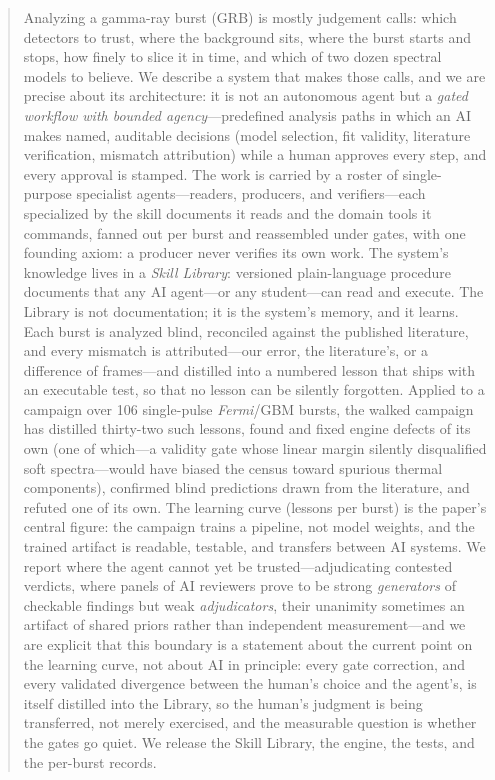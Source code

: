 \begin{abstract}
Analyzing a gamma-ray burst (GRB) is mostly judgement calls: which detectors to trust,
where the background sits, where the burst starts and stops, how finely to
slice it in time, and which of two dozen spectral models to believe.
We describe a system that makes those calls, and we are precise about its
architecture: it is not an autonomous agent but a \emph{gated workflow with
bounded agency}---predefined analysis paths in which an AI makes named,
auditable decisions (model selection, fit validity, literature verification,
mismatch attribution) while a human approves every step, and every approval
is stamped. The work is carried by a roster of single-purpose specialist
agents---readers, producers, and verifiers---each specialized by the skill
documents it reads and the domain tools it commands, fanned out per burst
and reassembled under gates, with one founding axiom: a producer never
verifies its own work. The system's knowledge lives in a \emph{Skill Library}: versioned
plain-language procedure documents that any AI agent---or any student---can
read and execute. The Library is not documentation; it is the system's
memory, and it learns. Each burst is analyzed blind, reconciled against the
published literature, and every mismatch is attributed---our error, the
literature's, or a difference of frames---and distilled into a numbered
lesson that ships with an executable test, so that no lesson can be silently
forgotten. Applied to a campaign over 106 single-pulse \textit{Fermi}/GBM
bursts, the walked campaign has distilled thirty-two such lessons\prov{},
found and fixed engine defects of its own (one of which---a validity gate whose
linear margin silently disqualified soft spectra---would have biased the
census toward spurious thermal components), confirmed blind predictions
drawn from the literature, and refuted one of its own. The learning curve
(lessons per burst) is the paper's central figure: the campaign trains a
pipeline, not model weights, and the trained artifact is readable, testable,
and transfers between AI systems. We report where the agent cannot yet
be trusted---adjudicating contested verdicts, where panels of AI reviewers
prove to be strong \emph{generators} of checkable findings but weak
\emph{adjudicators}, their unanimity sometimes an artifact of shared priors
rather than independent measurement---and we are explicit that this boundary
is a statement about the current point on the learning curve, not about AI
in principle: every gate correction, and every validated divergence between
the human's choice and the agent's, is itself distilled into the Library, so
the human's judgment is being transferred, not merely exercised, and the
measurable question is whether the gates go quiet. We release the Skill
Library, the engine, the tests, and the per-burst records.
\end{abstract}
